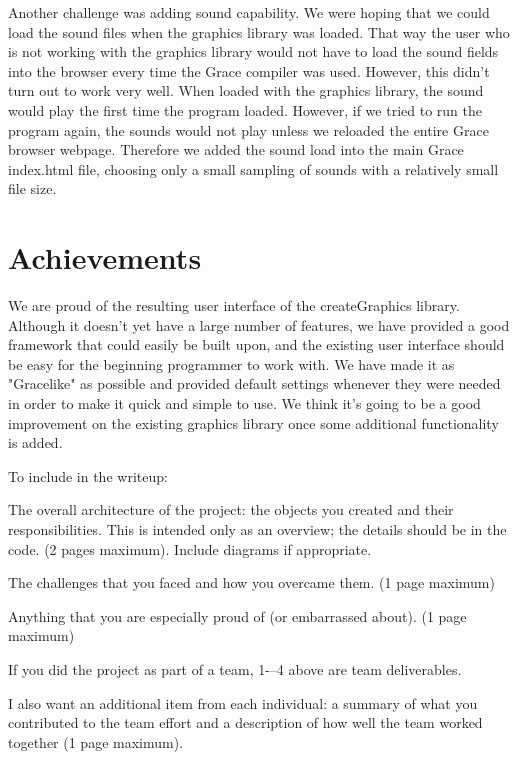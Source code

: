 \documentclass{article}
\begin{document}
Another challenge was adding sound capability. We were hoping that we could load the sound files when the
graphics library was loaded. That way the user who is not working with the graphics library would not have to load
the sound fields into the browser every time the Grace compiler was used. However, this didn't turn out to work very
well. When loaded with the graphics library, the sound would play the first time the program loaded. However, if
we tried to run the program again, the sounds would not play unless we reloaded the entire Grace browser webpage.
Therefore we added the sound load into the main Grace index.html file, choosing only a small sampling of sounds with
a relatively small file size.

\section {Achievements}
We are proud of the resulting user interface of the createGraphics library. Although it doesn't yet have a large
number of features, we have provided a good framework that could easily be built upon, and the existing user
interface should be easy for the beginning programmer to work with. We have made it as "Gracelike" as possible
and provided default settings whenever they were needed in order to make it quick and simple to use. We think
it's going to be a good improvement on the existing graphics library once some additional functionality is added.

To include in the writeup:

The overall architecture of the project: the objects you created and their responsibilities.  This is intended only as an overview; the details should be in the code. (2 pages maximum). Include diagrams if appropriate.

The challenges that you faced and how you overcame them. (1 page maximum)

Anything that you are especially proud of (or embarrassed about). (1 page maximum)

If you did the project as part of a team, 1-–4 above are team deliverables.  

I also want an additional item from each individual: a summary of what you contributed to the team effort and a description of how well the team worked together (1 page maximum).
\end{document}
